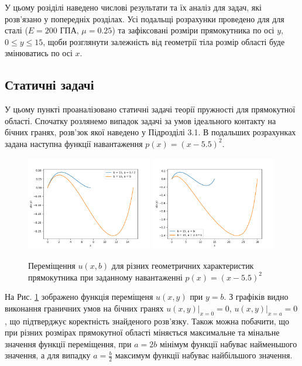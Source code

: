 У цьому розіділі наведено числові результати та їх аналіз для задач,
які розв'язано у попередніх розділах.
Усі подальщі розрахунки проведено для для сталі ($E=200$ ГПА, $\mu=0.25$) та зафіксовані розміри прямокутника по осі $y$, $0 \le y \le 15$, 
щоби розглянути залежність від геометрії тіла розмір області буде змінюватись по осі $x$.

\subsection{Статичні задачі}

У цьому пункті проаналізовано статичні задачі теорії пружності для прямокутної області.
Спочатку розлянемо випадок задачі за умов ідеального контакту на бічних гранях,
розв'зок якої наведено у Підрозділі 3.1. В подальших розрахунках задана наступна функції навантаження $p(x) = (x - 5.5)^2$.
\begin{figure}[H]
    \begin{center}
        \includegraphics[width=0.49\textwidth, scale=1]{images/results/static_1/u(x,b)1.png}
        \includegraphics[width=0.49\textwidth, scale=1]{images/results/static_1/u(x,b)2.png}
        \caption{Переміщення $u(x, b)$ для різних геометричних характеристик прямокутника при заданному навантаженні $p(x) = (x - 5.5)^2$}\label{static_1_u(x,b)}
    \end{center}
\end{figure}

На Рис. \ref{static_1_u(x,b)} зображено функція переміщеня $u(x, y)$ при $y=b$.
З графіків видно виконання граничних умов на бічних гранях $u(x,y) |_{x=0} = 0$, $u(x,y) |_{x=a} = 0$,
що підтверджує коректність знайденого розв'язку.
Також можна побачити, що при різних розмірах прямокутної області міняється максимальне та мінальне значення функції переміщення,
при $a = 2b$ мінімум функції набуває найменьшого значення, а для випадку $a = \frac{b}{2}$ максимум функції набуває найбільшого значення.

